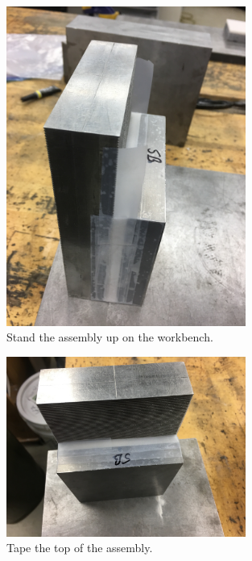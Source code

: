 \begin{figure}
	\centering
        \includegraphics[width=0.7\textwidth]{appendix_sample_prep/dds_standup_one_block.jpg}
   	\caption{Stand the assembly up on the workbench.}
  	\label{Fig:dds_standup_one_block}
\end{figure}

\begin{figure}
	\centering
        \includegraphics[width=0.7\textwidth]{appendix_sample_prep/dds_one_block_taped.jpg}
   	\caption{Tape the top of the assembly.}
  	\label{Fig:dds_one_block_taped}
\end{figure}

